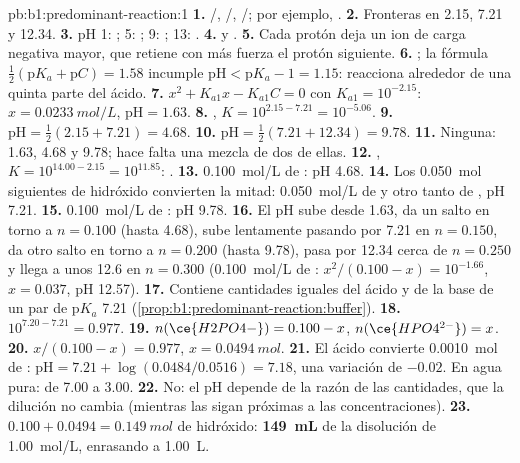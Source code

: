 \begin{solution}{pb:b1:predominant-reaction:1}
\textbf{1.} /, /,
/; por ejemplo, .
\textbf{2.} Fronteras en 2.15, 7.21 y 12.34.
\textbf{3.} pH 1: ; 5: ; 9: ; 13:
.
\textbf{4.}  y .
\textbf{5.} Cada protón deja un ion de carga negativa mayor, que retiene
con más fuerza el protón siguiente.
\textbf{6.} ; la fórmula
$\frac12(\mathrm{p}K_a + \mathrm{p}C) = 1.58$ incumple $\mathrm{pH} <
\mathrm{p}K_a - 1 = 1.15$: reacciona alrededor de una quinta parte del
ácido.
\textbf{7.} $x^2 + K_{a1}x - K_{a1}C = 0$ con $K_{a1} = 10^{-2.15}$: $x =
\qty{0.0233}{mol/L}$, $\mathrm{pH} = 1.63$.
\textbf{8.} , $K = 10^{2.15 - 7.21} =
10^{-5.06}$.
\textbf{9.} $\mathrm{pH} = \frac12(2.15 + 7.21) = 4.68$.
\textbf{10.} $\mathrm{pH} = \frac12(7.21 + 12.34) = 9.78$.
\textbf{11.} Ninguna: 1.63, 4.68 y 9.78; hace falta una mezcla de dos de
ellas.
\textbf{12.} , $K = 10^{14.00 - 2.15} =
10^{11.85}$: .
\textbf{13.} \qty{0.100}{mol/L} de : pH 4.68.
\textbf{14.} Los \qty{0.050}{mol} siguientes de hidróxido convierten la
mitad: \qty{0.050}{mol/L} de  y otro tanto de ,
pH 7.21.
\textbf{15.} \qty{0.100}{mol/L} de : pH 9.78.
\textbf{16.} El pH sube desde 1.63, da un salto en torno a $n = 0.100$
(hasta 4.68), sube lentamente pasando por 7.21 en $n = 0.150$, da otro
salto en torno a $n = 0.200$ (hasta 9.78), pasa por 12.34 cerca de
$n = 0.250$ y llega a unos 12.6 en $n = 0.300$ (\qty{0.100}{mol/L} de
: $x^2/(0.100 - x) = 10^{-1.66}$, $x = 0.037$, pH 12.57).
\textbf{17.} Contiene cantidades iguales del ácido y de la base de un par
de $\mathrm{p}K_a$ 7.21 (\cref{prop:b1:predominant-reaction:buffer}).
\textbf{18.} $10^{7.20 - 7.21} = 0.977$.
\textbf{19.} $n(\ce{H2PO4-}) = 0.100 - x$, $n(\ce{HPO4^{2-}}) = x$.
\textbf{20.} $x/(0.100 - x) = 0.977$, $x = \qty{0.0494}{mol}$.
\textbf{21.} El ácido convierte \qty{0.0010}{mol} de :
$\mathrm{pH} = 7.21 + \log(0.0484/0.0516) = 7.18$, una variación de
$-0.02$. En agua pura: de 7.00 a 3.00.
\textbf{22.} No: el pH depende de la razón de las cantidades, que la
dilución no cambia (mientras las  sigan próximas a las
concentraciones).
\textbf{23.} $0.100 + 0.0494 = \qty{0.149}{mol}$ de hidróxido:
\textbf{\qty{149}{mL}} de la disolución de \qty{1.00}{mol/L}, enrasando a
\qty{1.00}{L}.
\end{solution}
